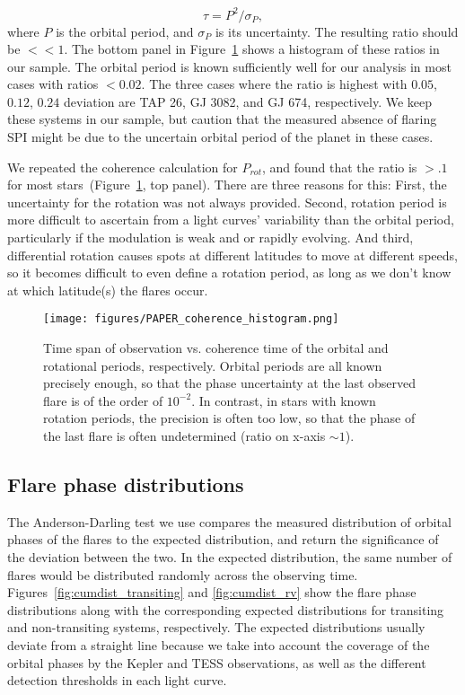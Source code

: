 \documentclass[twocolumn]{aastex631}
\begin{document}
\begin{equation}
    \tau = P^2 / \sigma_P,
\end{equation}
where $P$ is the orbital period, and $\sigma_P$ is its uncertainty.
The resulting ratio should be $<<1$. The bottom panel in Figure~\ref{fig:coherence_hist} shows a histogram of these ratios in our sample. The orbital period is known sufficiently well for our analysis in most cases with ratios $<0.02$. The three cases where the ratio is highest with $0.05$, $0.12$, $0.24$ deviation are TAP 26, GJ 3082, and GJ 674, respectively. We keep these systems in our sample, but caution that the measured absence of flaring SPI might be due to the uncertain orbital period of the planet in these cases.

We repeated the coherence calculation for $P_{rot}$, and found that the ratio is $>.1$ for most stars~(Figure~\ref{fig:coherence_hist}, top panel). There are three reasons for this: First, the uncertainty for the rotation was not always provided. Second, rotation period is more difficult to ascertain from a light curves' variability than the orbital period, particularly if the modulation is weak and or rapidly evolving. And third, differential rotation causes spots at different latitudes to move at different speeds, so it becomes difficult to even define a rotation period, as long as we don't know at which latitude(s) the flares occur.

\begin{figure}[ht!]
    \begin{centering}
        \texttt{[image: figures/PAPER\_coherence\_histogram.png]}
        \caption{
           Time span of observation vs. coherence time of the orbital and rotational periods, respectively. Orbital periods are all known precisely enough, so that the phase uncertainty at the last observed flare is of the order of $10^{-2}$. In contrast, in stars with known rotation periods, the precision is often too low, so that the phase of the last flare is often undetermined (ratio on x-axis $\sim 1$).
        }
        \label{fig:coherence_hist}
    \end{centering}
\end{figure}

\subsection{Flare phase distributions}
\label{sec:results:phasedist}
The Anderson-Darling test we use compares the measured distribution of orbital phases of the flares to the expected distribution, and return the significance of the deviation between the two. In the expected distribution, the same number of flares would be distributed randomly across the observing time. Figures~\ref{fig:cumdist_transiting} and \ref{fig:cumdist_rv} show the flare phase distributions along with the corresponding expected distributions for transiting and non-transiting systems, respectively. The expected distributions usually deviate from a straight line because we take into account the coverage of the orbital phases by the Kepler and TESS observations, as well as the different detection thresholds in each light curve.
\end{document}
